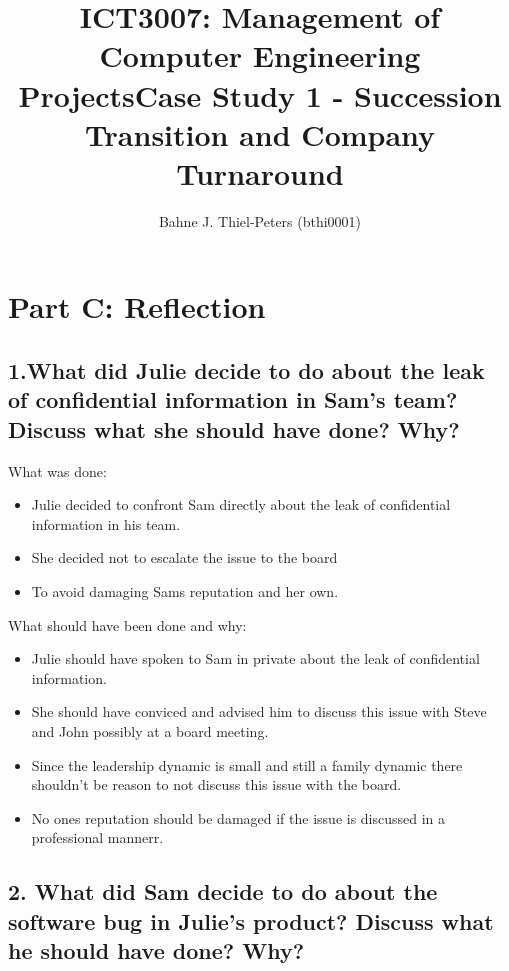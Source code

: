 \documentclass[a4paper,10pt]{article}
\title{ICT3007: Management of Computer Engineering Projects\newline \centering Case Study 1 - Succession Transition and Company Turnaround}
\author{
Bahne J. Thiel-Peters (bthi0001)
}
\begin{document}
\maketitle
\thispagestyle{empty}

\setcounter{page}{1}

\section{Part C: Reflection}
\subsection{1.What did Julie decide to do about the leak of confidential information in Sam’s team? Discuss what she should have done? Why?}

What was done:
\begin{itemize}
    \item Julie decided to confront Sam directly about the leak of confidential information in his team.
    \item She decided not to escalate the issue to the board
    \item To avoid damaging Sams reputation and her own.
\end{itemize}

What should have been done and why:
\begin{itemize}
    \item Julie should have spoken to Sam in private about the leak of confidential information.
    \item She should have conviced and advised him to discuss this issue with Steve and John possibly at a board meeting.
    \item Since the leadership dynamic is small and still a family dynamic there shouldn't be reason to not discuss this issue with the board. 
    \item No ones reputation should be damaged if the issue is discussed in a professional mannerr.
\end{itemize}

\subsection{2. What did Sam decide to do about the software bug in Julie’s product? Discuss what he should have done? Why?}
\end{document}
